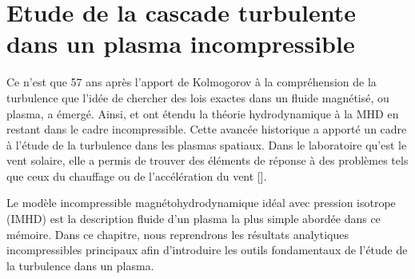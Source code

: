 \chapter{Etude de la cascade turbulente dans un plasma incompressible}
\renewcommand\partie{\Partie\ Chapitre \thechapter}
\label{ch-11}

\minitoc  

\bigskip

Ce n'est que 57 ans après l'apport de Kolmogorov à la compréhension de la turbulence que l'idée de chercher des lois exactes dans un fluide magnétisé, ou plasma, a émergé. Ainsi, \cite{politano_von_1998} et \cite{politano_dynamical_1998} ont étendu la théorie hydrodynamique à la \ac{MHD} en restant dans le cadre incompressible. Cette avancée historique a apporté un cadre à l'étude de la turbulence dans les plasmas spatiaux. Dans le laboratoire qu'est le vent solaire, elle a permis de trouver des éléments de réponse à des problèmes tels que ceux du chauffage ou de l'accélération du vent [\cite{smith_dependence_2006,sorriso-valvo_observation_2007,stawarz_turbulent_2009,osman_proton_2013,bruno_solar_2013,alexandrova_solar_2013,sahraoui_magnetohydrodynamic_2020,marino_scaling_2023}]. 

Le modèle incompressible magnétohydrodynamique idéal avec pression isotrope (\acs{IMHD}) est la description fluide d'un plasma la plus simple abordée dans ce mémoire. Dans ce chapitre, nous reprendrons les résultats analytiques incompressibles principaux afin d'introduire les outils fondamentaux de l'étude de la turbulence dans un plasma.

